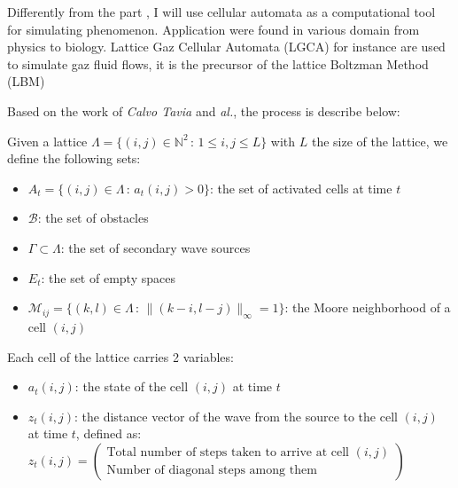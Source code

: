 \documentclass[../main.tex]{subfiles}
\begin{document}
\vspace{1em}

Differently from the part \figtonum, I will use cellular automata as a computational tool for simulating phenomenon. Application were found in various domain from physics to biology. Lattice Gaz Cellular Automata (LGCA) for instance are used to simulate gaz fluid flows, it is the precursor of the lattice Boltzman Method (LBM)\cite{chen_1998}

\vspace{1em}

Based on the work of \textit{Calvo Tavia} and \textit{al.}\cite{tapia_2016}, the process is describe below:

\vspace{1em}

Given a lattice $\Lambda = \{(i,j) \in \mathbb{N}^{2} \,:\, 1 \leq i, j \leq L\}$ with $L$ the size of the lattice, we define the following sets:
\vspace{1em}

\begin{itemize}
	\item $A_t = \{ (i, j) \in \Lambda \,:\, a_t(i, j) > 0\}$: the set of activated cells at time $t$
	\item $\mathcal{B}$: the set of obstacles
	\item $\Gamma \subset \Lambda$: the set of secondary wave sources
	\item $E_t$: the set of empty spaces
	\item $\mathcal{M}_{ij} = \{ (k, l) \in \Lambda \,:\, \|(k - i, l - j)\|_{\infty} = 1\}$: the Moore neighborhood of a cell $(i, j)$
\end{itemize}

\vspace{1em}

Each cell of the lattice carries 2 variables:
\begin{itemize}
	\item $a_t (i, j)$: the state of the cell $(i, j)$ at time $t$
	\item $z_t (i, j)$: the distance vector of the wave from the source to the cell $(i, j)$ at time $t$, defined as:
	$z_t (i, j) = \begin{pmatrix}
		\text{Total number of steps taken to arrive at cell } (i, j) \\
		\text{Number of diagonal steps among them}
	\end{pmatrix}$
\end{itemize}
\end{document}
